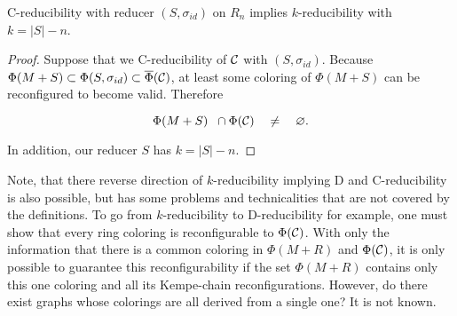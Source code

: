 \begin{theorem}
    C-reducibility with reducer $(S, \sigma_{id})$ on $R_n$ implies $k$-reducibility with $k = |S|-n$.
\end{theorem}

\begin{proof}
Suppose that we C-reducibility of $\mathcal{C}$ with $(S, \sigma_{id})$. Because $\Phi(M+ S) \subset \Phi(S, \sigma_{id}) \subset \overline{\Phi}(\mathcal{C})$, at least some coloring of $\Phi(M+S)$ can be reconfigured to become valid. Therefore

\begin{equation}
    \Phi(M+S) \;\; \cap \Phi(\mathcal{C}) \quad \neq \quad \varnothing.
\end{equation}

In addition, our reducer $S$ has $k = |S| - n$.

\end{proof}

Note, that there reverse direction of $k$-reducibility implying D and C-reducibility is also possible, but has some problems and technicalities that are not covered by the definitions. To go from $k$-reducibility to D-reducibility for example, one must show that every ring coloring is reconfigurable to $\Phi(\mathcal{C})$. With only the information that there is a common coloring in $\Phi(M+R)$ and $\Phi(\mathcal{C})$, it is only possible to guarantee this reconfigurability if the set $\Phi(M+R)$ contains only this one coloring and all its Kempe-chain reconfigurations. However, do there exist graphs whose colorings are all derived from a single one? It is not known.